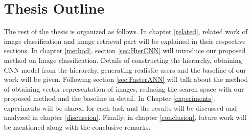 \section{Thesis Outline}

The rest of the thesis is organized as follows. 
In chapter \ref{related}, related work of image classification and image retrieval part will be explained in their respective sections. In chapter \ref{method}, section \ref{sec:HierCNN} will introduce our proposed method on Image classification. 
Details of constructing the hierarchy, obtaining CNN model from the hierarchy, generating realistic users and the baseline of our work will be given. 
Following section \ref{sec:FasterANN} will talk about the method of obtaining vector representation of images, reducing the search space with our proposed method and the baseline in detail.
In Chapter \ref{experiments}, experiments will be shared for each task and the results will be discussed and analyzed in chapter \ref{discussion}. Finally, in chapter \ref{conclusion}, future work will be mentioned along with the conclusive remarks.

